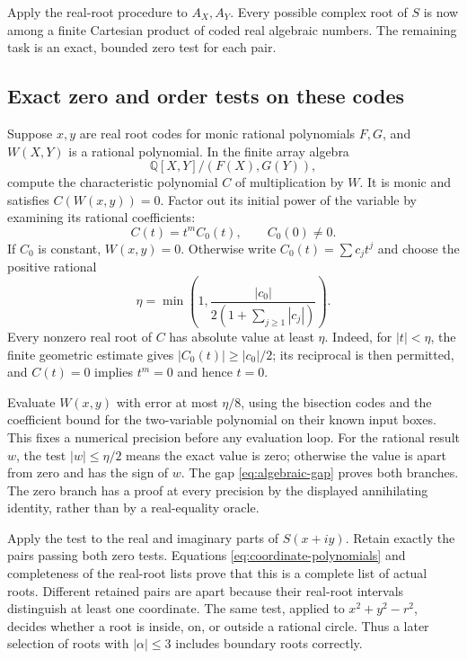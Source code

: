 Apply the real-root procedure to $A_X,A_Y$. Every possible complex root
of $S$ is now among a finite Cartesian product of coded real algebraic
numbers. The remaining task is an exact, bounded zero test for each pair.

\subsection{Exact zero and order tests on these codes}

Suppose $x,y$ are real root codes for monic rational polynomials $F,G$,
and $W(X,Y)$ is a rational polynomial. In the finite array algebra
\[
                  \mathbb Q[X,Y]/(F(X),G(Y)),
\]
compute the characteristic polynomial $C$ of multiplication by $W$.
It is monic and satisfies $C(W(x,y))=0$. Factor out its initial power of
the variable by examining its rational coefficients:
\[
                    C(t)=t^mC_0(t),\qquad C_0(0)\ne0.
\]
If $C_0$ is constant, $W(x,y)=0$. Otherwise write $C_0(t)=\sum c_jt^j$
and choose the positive rational
\begin{equation}
 \eta=\min\left(1,\frac{|c_0|}{2(1+\sum_{j\ge1}|c_j|)}\right).
                                                        \label{eq:algebraic-gap}
\end{equation}
Every nonzero real root of $C$ has absolute value at least $\eta$.
Indeed, for $|t|<\eta$, the finite geometric estimate gives
$|C_0(t)|\ge |c_0|/2$; its reciprocal is then permitted, and
$C(t)=0$ implies $t^m=0$ and hence $t=0$.

Evaluate $W(x,y)$ with error at most $\eta/8$, using the bisection codes
and the coefficient bound for the two-variable polynomial on their known
input boxes. This fixes a numerical precision before any evaluation loop.
For the rational result $w$, the test $|w|\le\eta/2$ means the exact
value is zero; otherwise the value is apart from zero and has the sign of
$w$. The gap \eqref{eq:algebraic-gap} proves both branches. The zero
branch has a proof at every precision by the displayed annihilating
identity, rather than by a real-equality oracle.

Apply the test to the real and imaginary parts of $S(x+iy)$. Retain
exactly the pairs passing both zero tests. Equations
\eqref{eq:coordinate-polynomials} and completeness of the real-root lists
prove that this is a complete list of actual roots. Different retained
pairs are apart because their real-root intervals distinguish at least
one coordinate. The same test, applied to $x^2+y^2-r^2$, decides whether
a root is inside, on, or outside a rational circle. Thus a later selection
of roots with $|\alpha|\le3$ includes boundary roots correctly.

